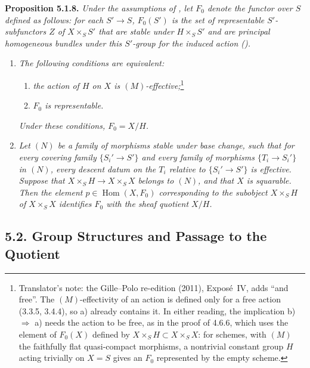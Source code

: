 \medskip
\noindent{}\textbf{Proposition 5.1.8.}
\textit{Under the assumptions of , let \(F_0\) denote the functor over
\(S\) defined as follows: for each \(S'\to S\), \(F_0(S')\) is the set of
representable \(S'\)-subfunctors \(Z\) of \(X\times_SS'\) that are stable
under \(H\times_SS'\) and are principal homogeneous bundles under this
\(S'\)-group for the induced action ().}
\begin{enumerate}
  \item[(i)] \textit{The following conditions are equivalent:}
  \begin{enumerate}
    \item[(a)] \textit{the action of \(H\) on \(X\) is
    \((M)\)-effective;}\footnote{Translator's note: the Gille--Polo re-edition (2011), Expos\'e~IV, adds
``and free''. The \((M)\)-effectivity of an action is defined only for a free
action (3.3.5, 3.4.4), so a) already contains it. In either reading, the
implication b) \(\Rightarrow\) a) needs the action to be free, as in the proof
of 4.6.6, which uses the element of \(F_0(X)\) defined by
\(X\times_SH\subset X\times_SX\): for schemes, with \((M)\) the faithfully flat
quasi-compact morphisms, a nontrivial constant group \(H\) acting trivially on
\(X=S\) gives an \(F_0\) represented by the empty scheme.}
    \item[(b)] \textit{\(F_0\) is representable.}
  \end{enumerate}
  \textit{Under these conditions, \(F_0=X/H\).}
  \item[(ii)] \textit{Let \((N)\) be a family of morphisms stable under
  base change, such that for every covering family
  \(\{S_i'\to S'\}\) and every family of morphisms
  \(\{T_i\to S_i'\}\) in \((N)\), every descent datum on the \(T_i\)
  relative to \(\{S_i'\to S'\}\) is effective. Suppose that
  \(X\times_SH\to X\times_SX\) belongs to \((N)\), and that \(X\) is
  squarable. Then the element \(p\in\operatorname{Hom}(X,F_0)\)
  corresponding to the subobject \(X\times_SH\) of \(X\times_SX\)
  identifies \(F_0\) with the sheaf quotient \(X/H\).}
\end{enumerate}

\subsection*{5.2. Group Structures and Passage to the Quotient}

